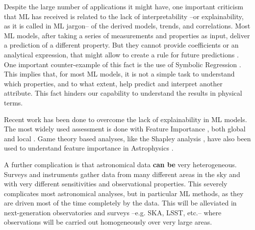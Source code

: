 \documentclass{aa}
\begin{document}
Despite the large number of applications it might have, one important criticism that ML has received is related to the lack of interpretability --or explainability, as it is called in ML jargon-- of the derived models, trends, and correlations. Most ML models, after taking a series of measurements and properties as input, deliver a prediction of a different property. But they cannot provide coefficients or an analytical expression, that might allow to create a rule for future predictions \citep{goebel2018explainable}. One important counter-example of this fact is the use of Symbolic Regression \citep[e.g.][]{2020arXiv200611287C, 2021ApJ...915...71V}. This implies that, for most ML models, it is not a simple task to understand which properties, and to what extent, help predict and interpret another attribute. This fact hinders our capability to understand the results in physical terms.

Recent work has been done to overcome the lack of explainability in ML models. The most widely used assessment is done with Feature Importance \citep{10.1007/978-3-030-10925-7_40, 9007737}, both global and local \citep{Saarela2021}. Game theory based analyses, like the Shapley analysis \citep{Shapley_article}, have also been used to understand feature importance in Astrophysics \citep[e.g.][]{2021MNRAS.507.1468M, 2022MNRAS.515.5285D, 2021Galax...9...86C, 2022MNRAS.509.3441A, 2022MNRAS.516.4716A}. 

A further complication is that astronomical data \textbf{can be} very heterogeneous. 
Surveys and instruments gather data from many different areas in the sky and with very different sensitivities and observational properties. This severely complicates most astronomical analyses, but in particular ML methods, as they are driven most of the time completely by the data.
This will be alleviated in next-generation observatories and surveys --e.g. SKA, LSST, etc.-- where observations will be carried out homogeneously over very large areas.
\end{document}
